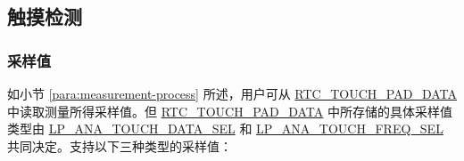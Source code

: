 \documentclass[main\_\_CN.tex]{subfiles}
\begin{document}
\subsection{触摸检测}

\subsubsection{采样值}
\label{para:sampled-value}

如小节 \ref{para:measurement-process} 所述，用户可从
\hyperref[fielddesc:RTCTOUCHPAD0DATA]{RTC\_TOUCH\_PAD\_DATA} 中读取测量所得采样值。但 \hyperref[fielddesc:RTCTOUCHPAD0DATA]{RTC\_TOUCH\_PAD\_DATA} 中所存储的具体采样值类型由 \hyperref[fielddesc:LPANATOUCHDATASEL]{LP\_ANA\_TOUCH\_DATA\_SEL} 和 \hyperref[fielddesc:LPANATOUCHFREQSEL]{LP\_ANA\_TOUCH\_FREQ\_SEL} 共同决定。支持以下三种类型的采样值： 
\end{document}

